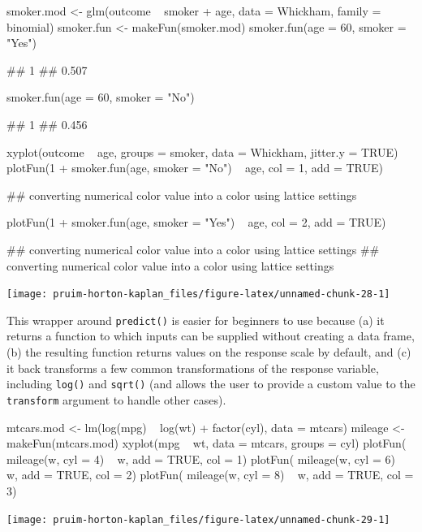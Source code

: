 \begin{Schunk}
\begin{Sinput}
smoker.mod <- glm(outcome ~ smoker + age, data = Whickham, family = binomial)
smoker.fun <- makeFun(smoker.mod)
smoker.fun(age = 60, smoker = "Yes")
\end{Sinput}
\begin{Soutput}
##     1 
## 0.507
\end{Soutput}
\begin{Sinput}
smoker.fun(age = 60, smoker = "No")
\end{Sinput}
\begin{Soutput}
##     1 
## 0.456
\end{Soutput}
\begin{Sinput}
xyplot(outcome ~ age, groups = smoker, data = Whickham, jitter.y = TRUE)
plotFun(1 + smoker.fun(age, smoker = "No") ~ age, col = 1, add = TRUE)
\end{Sinput}
\begin{Soutput}
## converting numerical color value into a color using lattice settings
\end{Soutput}
\begin{Sinput}
plotFun(1 + smoker.fun(age, smoker = "Yes") ~ age, col = 2, add = TRUE)
\end{Sinput}
\begin{Soutput}
## converting numerical color value into a color using lattice settings
## converting numerical color value into a color using lattice settings
\end{Soutput}


\begin{center}\texttt{[image: pruim-horton-kaplan\_files/figure-latex/unnamed-chunk-28-1]} \end{center}

\end{Schunk}

This wrapper around \texttt{predict()} is easier for beginners to use
because (a) it returns a function to which inputs can be supplied
without creating a data frame, (b) the resulting function returns values
on the response scale by default, and (c) it back transforms a few
common transformations of the response variable, including
\texttt{log()} and \texttt{sqrt()} (and allows the user to provide a
custom value to the \texttt{transform} argument to handle other cases).

\begin{Schunk}
\begin{Sinput}
mtcars.mod <- lm(log(mpg) ~ log(wt) + factor(cyl), data = mtcars)
mileage <- makeFun(mtcars.mod)
xyplot(mpg ~ wt, data = mtcars, groups = cyl)
plotFun( mileage(w, cyl = 4) ~ w, add = TRUE, col = 1)
plotFun( mileage(w, cyl = 6) ~ w, add = TRUE, col = 2)
plotFun( mileage(w, cyl = 8) ~ w, add = TRUE, col = 3)
\end{Sinput}


\begin{center}\texttt{[image: pruim-horton-kaplan\_files/figure-latex/unnamed-chunk-29-1]} \end{center}

\end{Schunk}

